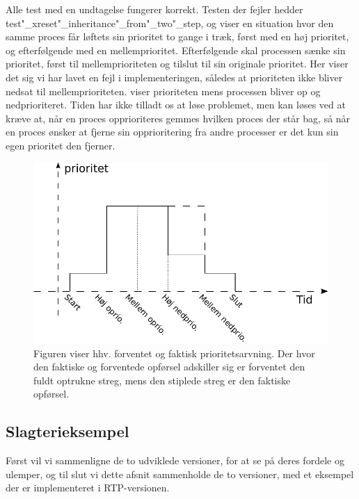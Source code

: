  Alle test med en undtagelse fungerer korrekt. Testen der fejler hedder test"_xreset"_inheritance"_from"_two"_step, og viser en situation hvor den samme proces får løftets sin prioritet to gange i træk, først med en høj prioritet, og efterfølgende med en mellemprioritet. Efterfølgende skal processen sænke sin prioritet, først til  mellemprioriteten og tilslut til sin originale prioritet. Her viser det sig vi har lavet en fejl i implementeringen, således at prioriteten ikke bliver nedsat til mellemprioriteten.  viser prioriteten mens processen bliver op og nedprioriteret. Tiden har ikke tilladt os at løse problemet, men  kan løses ved at kræve at, når en proces opprioriteres gemmes hvilken proces der står bag, så når en proces ønsker at fjerne sin opprioritering fra andre processer er det kun sin egen  prioritet den fjerner.  
 
  
\begin{figure}
 \begin{center}
  \includegraphics[scale=1]{images/priority-inheritance}
	\caption{Figuren viser hhv. forventet og faktisk prioritetsarvning. Der hvor den faktiske og forventede opførsel adskiller sig er forventet den fuldt optrukne streg, mens den stiplede streg er den faktiske opførsel.}
	\label{fig:priority-inheritance}
\end{center}
\end{figure}
  

\subsection{Slagterieksempel}




Først vil vi sammenligne de to udviklede versioner, for at se på deres fordele og ulemper, og til slut vi dette afsnit sammenholde de to versioner, med et  eksempel der er implementeret i RTP-versionen.

